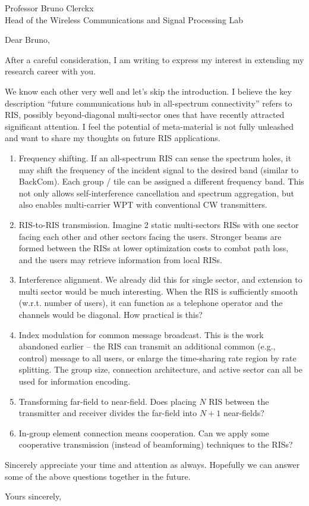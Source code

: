 \documentclass[10pt]{scrartcl}
\begin{document}

\begin{letter}{%
		Professor Bruno Clerckx\\
		Head of the Wireless Communications and Signal Processing Lab
	}
	\opening{Dear Bruno,}
	After a careful consideration, I am writing to express my interest in extending my research career with you.

	We know each other very well and let's skip the introduction.
	I believe the key description ``future communications hub in all-spectrum connectivity'' refers to RIS, possibly beyond-diagonal multi-sector ones that have recently attracted significant attention.
	I feel the potential of meta-material is not fully unleashed and want to share my thoughts on future RIS applications.
	\begin{enumerate}
		\item Frequency shifting. If an all-spectrum RIS can sense the spectrum holes, it may shift the frequency of the incident signal to the desired band (similar to BackCom). Each group / tile can be assigned a different frequency band. This not only allows self-interference cancellation and spectrum aggregation, but also enables multi-carrier WPT with conventional CW transmitters.
		\item RIS-to-RIS transmission. Imagine 2 static multi-sectors RISs with one sector facing each other and other sectors facing the users. Stronger beams are formed between the RISs at lower optimization costs to combat path loss, and the users may retrieve information from local RISs.
		\item Interference alignment. We already did this for single sector, and extension to multi sector would be much interesting. When the RIS is sufficiently smooth (w.r.t. number of users), it can function as a telephone operator and the channels would be diagonal. How practical is this?
		\item Index modulation for common message broadcast. This is the work abandoned earlier -- the RIS can transmit an additional common (e.g., control) message to all users, or enlarge the time-sharing rate region by rate splitting. The group size, connection architecture, and active sector can all be used for information encoding.
		\item Transforming far-field to near-field. Does placing $N$ RIS between the transmitter and receiver divides the far-field into $N+1$ near-fields?
		\item In-group element connection means cooperation. Can we apply some cooperative transmission (instead of beamforming) techniques to the RISs?
	\end{enumerate}

	Sincerely appreciate your time and attention as always. Hopefully we can answer some of the above questions together in the future.
	\closing{Yours sincerely,}
\end{letter}
\end{document}
